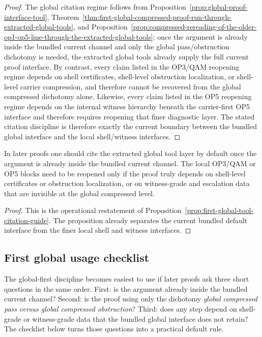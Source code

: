 \begin{proof}
The global citation regime follows from Proposition~\ref{prop:global-proof-interface-tool}, Theorem~\ref{thm:first-global-compressed-proof-run-through-extracted-global-tools}, and Proposition~\ref{prop:compressed-rereading-of-the-older-op1-op5-line-through-the-extracted-global-tools}: once the argument is already inside the bundled current channel and only the global pass/obstruction dichotomy is needed, the extracted global tools already supply the full current proof interface. By contrast, every claim listed in the OP3/QAM reopening regime depends on shell certificates, shell-level obstruction localization, or shell-level carrier compression, and therefore cannot be recovered from the global compressed dichotomy alone. Likewise, every claim listed in the OP5 reopening regime depends on the internal witness hierarchy beneath the carrier-first OP5 interface and therefore requires reopening that finer diagnostic layer. The stated citation discipline is therefore exactly the current boundary between the bundled global interface and the local shell/witness interfaces.
\end{proof}

\begin{corollary}
\label{cor:practical-citation-rule-for-the-current-global-tools}
In later proofs one should cite the extracted global tool layer by default once the argument is already inside the bundled current channel. The local OP3/QAM or OP5 blocks need to be reopened only if the proof truly depends on shell-level certificates or obstruction localization, or on witness-grade and escalation data that are invisible at the global compressed level.
\end{corollary}

\begin{proof}
This is the operational restatement of Proposition~\ref{prop:first-global-tool-citation-guide}. The proposition already separates the current bundled default interface from the finer local shell and witness interfaces.
\end{proof}

\subsection{First global usage checklist}
\label{sec:first-global-usage-checklist}

\begin{remark}
The global-first discipline becomes easiest to use if later proofs ask three short questions in the same order. First: is the argument already inside the bundled current channel? Second: is the proof using only the dichotomy \emph{global compressed pass versus global compressed obstruction}? Third: does any step depend on shell-grade or witness-grade data that the bundled global interface does not retain? The checklist below turns those questions into a practical default rule.
\end{remark}

